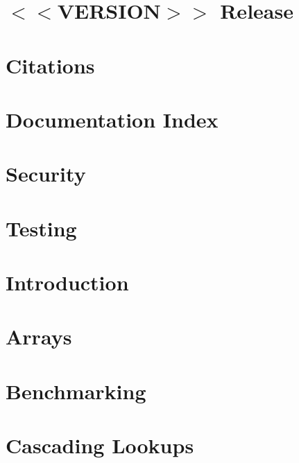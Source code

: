 \let\mypdfximage\pdfximage\def\pdfximage{\immediate\mypdfximage}\documentclass[twoside]{book}
\newcommand{\+}{\discretionary{\mbox{\scriptsize$\hookleftarrow$}}{}{}}
\begin{document}
\chapter{$<$$<$VERSION$>$$>$ Release}
\label{doc_news__preparation_next_release_md}

\chapter{Citations}
\label{doc_paper_README_md}

\chapter{Documentation Index}
\label{doc_README_md}

\chapter{Security}
\label{doc_SECURITY_md}

\chapter{Testing}
\label{doc_TESTING_md}

\chapter{Introduction}
\label{doc_tutorials_application-integration_md}

\chapter{Arrays}
\label{doc_tutorials_arrays_md}

\chapter{Benchmarking}
\label{doc_tutorials_benchmarking_md}

\chapter{Cascading Lookups}
\label{doc_tutorials_cascading_md}

\end{document}
